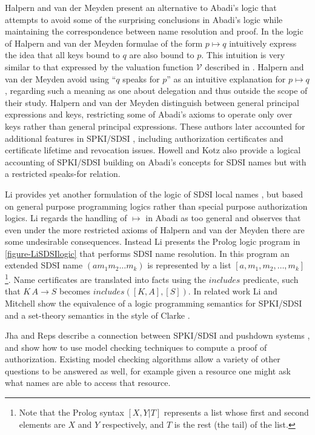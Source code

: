 Halpern and van der Meyden present an alternative to Abadi's logic
\cite{Halpern:LSSLLNS} that attempts to avoid some of the surprising
conclusions in Abadi's logic while maintaining the correspondence
between name resolution and proof.  In the logic of Halpern and van der
Meyden formulae of the form $p \mapsto q$ intuitively express the idea
that all keys bound to $q$ are also bound to $p$. This intuition is
very similar to that expressed by the valuation function $\mathcal{V}$
described in \cite{Clarke:CCDSS}. Halpern and van der Meyden avoid
using ``$q$ speaks for $p$'' as an intuitive explanation for $p
\mapsto q$, regarding such a meaning as one about delegation and thus
outside the scope of their study.  Halpern and van der Meyden
distinguish between general principal expressions and keys,
restricting some of Abadi's axioms to operate only over keys rather
than general principal expressions.  These authors later accounted for
additional features in SPKI/SDSI \cite{Halpern:LRS}, including
authorization certificates and certificate lifetime and revocation
issues. Howell and Kotz also provide a logical accounting of SPKI/SDSI
\cite{Howell:FSS,Howell:NSRAAB} building on Abadi's concepts
for SDSI names but with a restricted speaks-for relation.


\LiSDSIlogicfig

Li provides yet another formulation of the logic of SDSI local names
\cite{Li:LNSS}, but based on general purpose programming logics rather
than special purpose authorization logics. Li regards the handling of
$\mapsto$ in Abadi as too general and observes that even under the
more restricted axioms of Halpern and van der Meyden there are some
undesirable consequences. Instead Li presents the Prolog logic program in
\autoref{figure-LiSDSIlogic} that performs SDSI name resolution. In
this program an extended SDSI name $(a m_1 m_2
\ldots m_k)$ is represented by a list $[a, m_1, m_2, \ldots, m_k]$
\footnote{Note that the Prolog syntax $[X,Y|T]$ represents a 
list whose first and second elements are $X$ and $Y$ respectively,
and $T$ is the rest (the tail) of the list.}.
Name certificates are translated into facts using the
$\mathit{includes}$ predicate, such that $K\,A \rightarrow S$ becomes
$\mathit{includes}([K,A],[S])$.  In related work Li and Mitchell show 
the equivalence of a logic programming semantics for SPKI/SDSI and 
a set-theory semantics in the style of Clarke \cite{Li:USSUFOL}.

Jha and Reps describe a connection between SPKI/SDSI and pushdown systems
\cite{Jha:ASSCUMC}, and show how to use model checking techniques to
compute a proof of authorization. Existing model checking algorithms allow
a variety of other questions to be answered as well, for example given
a resource one might ask what names are able to access that resource.

